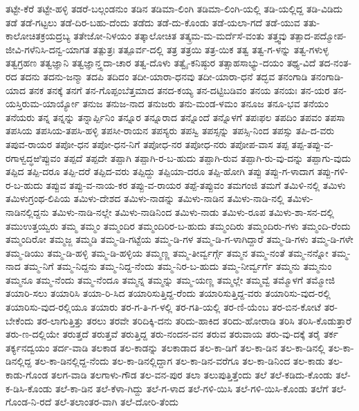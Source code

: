 ತಟ್ಟೇ-ಕೆರೆ
ತಟ್ಟೇ-ಹಳ್ಳಿ
ತಡರೆ-ಬಲ್ಗಂಡನುಂ
ತಡಿನ
ತಡಿಮಾ-ಲಿಂಗಿ
ತಡಿಮಾ-ಲಿಂಗಿ-ಯಲ್ಲಿ
ತಡಿ-ಯಲ್ಲಿದ್ದ
ತಡಿ-ವಿಡಿದು
ತಡೆ
ತಡೆ-ಗಟ್ಟಲು
ತಡೆ-ದಿರ-ಬಹು-ದೆಂದು
ತಡೆದು
ತಡೆ-ದು-ಕೊಂಡು
ತಡೆ-ಯಲಾ-ಗದೆ
ತಡೆ-ಯುವ
ತತು-ಕಾಲೋಚಿತಕ್ರಯದ್ರಬ್ಯ
ತತೇಜೋ-ನಿಳಯಂ
ತತ್ಕಾಲೋಚಿತ
ತತ್ಕ್ರಮ-ಮ-ಮರ್ದೆಸೆ-ವಂತು
ತತ್ತ್ವವು
ತತ್ಪಾದ-ಪದ್ಮೋಪ-ಜೀವಿ-ಗಳೆನಿಸಿ-ದನ್ವ-ಯಾಗತ
ತತ್ಪುತ್ರಃ
ತತ್ಪೂರ್ವ-ದಲ್ಲಿ
ತತ್ರ
ತತ್ರಯಿ
ತತ್ರ-ಯಿಕ
ತತ್ವ
ತತ್ವ-ಗ-ಳನ್ನು
ತತ್ವ-ಗಳುಳ್ಳ
ತತ್ವಗ್ರಹಣ
ತತ್ವಜ್ಞಾನಿ
ತತ್ವಜ್ಞಾನ್ತ್ಸದಾ-ಚಾರ
ತತ್ವ-ದೊಳು
ತತ್ವೈ-ಕನಿಷ್ಠುರ
ತತ್ಸಾಹಸಾಭ್ಯು-ದಯಂ
ತಥ್ಯ-ವಿದೆ
ತದ-ನಂತ-ರದ
ತದನು
ತದನು-ಜನ್ಮಾ
ತದಪಿ
ತದಿದಂ
ತದೀ-ಯಾರಾ-ಧನವು
ತದೀ-ಯಾರಾ-ಧನೆ
ತದ್ಭವ
ತನಂಗಾಡಿ
ತನಂಗಾಡಿ-ಯಾದ
ತನಕ
ತನಕ್ಕೆ
ತನಗೆ
ತನ-ಗೊಪ್ಪಂಬೆತ್ತಮಾದ
ತನದ-ಕಯ್ಯ
ತನ-ದಟ್ಟಿಬಡಿವಂ
ತನಯ
ತನಯಃ
ತನ-ಯರ
ತನ-ಯಸ್ತಿರುಮ-ಯಾರ್ಯ್ಯೋ
ತನುಜ
ತನುಜ-ನಾದ
ತನುಜರು
ತನು-ಮಂಡ-ಳಮಂ
ತನೂಜ
ತನೂ-ಭವ
ತನೆಯಂ
ತನೆಯರು
ತನ್ನ
ತನ್ನನ್ನು
ತನ್ನಾರ್ಪ್ಪಿನಿಂ
ತನ್ನೂರ
ತನ್ನೂರಾದ
ತನ್ನೊಂದೆ
ತನ್ನೊಳಗೆ
ತಪಃಫಲ
ತಪದಿಂ
ತಪವಂ
ತಪಸಾ
ತಪಸಿಯ
ತಪಸಿಯ-ತಪಸಿ-ಹಳ್ಳಿ
ತಪಸೀ-ರಾಯನ
ತಪಸ್ಯರು
ತಪಸ್ವಿ
ತಪಸ್ಸನ್ನು
ತಪಸ್ಸಿ-ನಿಂದ
ತಪಸ್ಸು
ತಪಿ-ದ-ವರು
ತಪುವ-ರಾಯರ
ತಪೋ-ಧನ
ತಪೋ-ಧನ-ನಿಗೆ
ತಪೋಧ-ನರ
ತಪೋಧ-ನರು
ತಪೋಪ-ವಾಸ
ತಪ್ಪ
ತಪ್ಪ-ತಪ್ಪು-ವ-ರಗಾಳ್ವದ್ಧಱಿಪ್ಪುವಂ
ತಪ್ಪದೆ
ತಪ್ಪದೇ
ತಪ್ಪಾಗಿ
ತಪ್ಪಾಗಿ-ರ-ಬ-ಹುದು
ತಪ್ಪಾಗಿ-ರುವ
ತಪ್ಪಾಗಿ-ರು-ವು-ದನ್ನು
ತಪ್ಪಾಗು-ವುದು
ತಪ್ಪಿದ
ತಪ್ಪಿ-ದರೂ
ತಪ್ಪಿ-ದರೆ
ತಪ್ಪಿದ-ವರು
ತಪ್ಪಿದ್ದು
ತಪ್ಪಿಯಾ-ದರೂ
ತಪ್ಪಿ-ಹೋಗಿ
ತಪ್ಪು
ತಪ್ಪು-ಗ-ಳಾದಾಗ
ತಪ್ಪು-ಗಳಿ-ರ-ಬ-ಹುದು
ತಪ್ಪುವ
ತಪ್ಪು-ವ-ನಾಯ-ಕರ
ತಪ್ಪು-ವ-ರಾಯರ
ತಪ್ಪೆ-ತಪ್ಪುವಂ
ತಮಗಂಜಿ
ತಮಗೆ
ತಮಿಳಿ-ನಲ್ಲಿ
ತಮಿಳು
ತಮಿಳುಗ್ರಂಥ-ಲಿಪಿಯ
ತಮಿಳು-ದೇಶದ
ತಮಿಳು-ನಾಡನ್ನು
ತಮಿಳು-ನಾಡಿನ
ತಮಿಳು-ನಾಡಿ-ನಲ್ಲಿ
ತಮಿಳು-ನಾಡಿನಲ್ಲಿದ್ದನು
ತಮಿಳು-ನಾಡಿ-ನಲ್ಲೇ
ತಮಿಳು-ನಾಡಿನಿಂದ
ತಮಿಳು-ನಾಡು
ತಮಿಳು-ರೂಪ
ತಮಿಳು-ಶಾ-ಸನ-ದಲ್ಲಿ
ತಮುಉತ್ತಯ್ವರು
ತಮ್ಮ
ತಮ್ಮಂ
ತಮ್ಮಂದಿರ
ತಮ್ಮಂದಿರಿರ-ಬ-ಹುದು
ತಮ್ಮಂದಿರು
ತಮ್ಮಂದಿರು-ಗಳು
ತಮ್ಮಂದಿ-ರೆಂದು
ತಮ್ಮಂದಿರೋ
ತಮ್ಮಜ್ಜ
ತಮ್ಮಡಿ
ತಮ್ಮ-ಡಿ-ಗಟ್ಟೆಯ
ತಮ್ಮ-ಡಿ-ಗಳ
ತಮ್ಮ-ಡಿ-ಗ-ಳಾಗಿದ್ದಾರೆ
ತಮ್ಮ-ಡಿ-ಗಳು
ತಮ್ಮ-ಡಿ-ಗಳೇ
ತಮ್ಮ-ಡಿಯು
ತಮ್ಮ-ಡಿ-ಹಳ್ಳಿ
ತಮ್ಮ-ಡಿ-ಹಳ್ಳಿಯ
ತಮ್ಮಣ್ಣ
ತಮ್ಮ-ತೀರ್ವ್ವರ್ಗ್ಗೆ
ತಮ್ಮನ
ತಮ್ಮ-ನಂತೆ
ತಮ್ಮ-ನನ್ನೋ
ತಮ್ಮ-ನಾದ
ತಮ್ಮ-ನಿಗೆ
ತಮ್ಮ-ನಿದ್ದನು
ತಮ್ಮ-ನಿದ್ದ-ನೆಂದು
ತಮ್ಮ-ನಿರ-ಬ-ಹುದು
ತಮ್ಮ-ನೀರ್ವ್ವರ್ಗೆ
ತಮ್ಮನು
ತಮ್ಮನುಂ
ತಮ್ಮನೂ
ತಮ್ಮ-ನೆಂದು
ತಮ್ಮ-ನೆಂದೂ
ತಮ್ಮನ್ನ
ತಮ್ಮನ್ನು
ತಮ್ಮ-ಯಣ್ಣ
ತಮ್ಮಲ್ಲೇ
ತಮ್ಮವ್ವೆ
ತಮ್ಮೊಳಗೆ
ತಮ್ಮೋಜಿ
ತಯಾರಿ-ಸಲು
ತಯಾರಿಸಿ
ತಯಾ-ರಿ-ಸಿದ
ತಯಾರಿಸುತ್ತಿದ್ದ-ರೆಂದು
ತಯಾರಿಸುತ್ತಿದ್ದ-ವರು
ತಯಾರಿಸು-ವುದ-ರಲ್ಲಿ
ತಯಾರಿಸು-ವುದ-ರಲ್ಲಿಯೂ
ತಯಾರು
ತರ-ಗ-ತಿ-ಗ-ಳಲ್ಲಿ
ತರ-ಗತಿ-ಯಲ್ಲಿ
ತರ-ಣಿ-ಯೆಂಬ
ತರ-ಬಿನ-ಕೋಟೆ
ತರ-ಬೇಕೆಂದು
ತರ-ಲಾಗುತ್ತಿತ್ತು
ತರಲು
ತರವೇ
ತರಿದಿಕ್ಕಿ-ದನು
ತರಿದು-ಹಾಕಿದ
ತರಿದು-ಹೋರಾಡಿ
ತರಿಸಿ
ತರಿಸಿ-ಕೊಡುತ್ತಾರೆ
ತರು-ಣ-ದಲ್ಲಿಯೇ
ತರುತ್ತದೆ
ತರುತ್ತವೆ
ತರುತ್ತಿದ್ದ
ತರು-ನಂದನ-ವನ
ತರುವ
ತರುವಾಯ
ತರು-ವು-ದಕ್ಕೆ
ತರೈ
ತರ್ಕ
ತರ್ಕ್ಯನದ್ವಯಂ
ತರ್ದ-ವಾಡಿ
ತಲಕಾಡ
ತಲ-ಕಾಡನ್ನು
ತಲಕಾಡಾದ
ತಲ-ಕಾ-ಡಿಗೆ
ತಲ-ಕಾ-ಡಿನ
ತಲ-ಕಾ-ಡಿನಲ್ಲಿ
ತಲ-ಕಾ-ಡಿನಲ್ಲಿದ್ದ
ತಲ-ಕಾ-ಡಿನಲ್ಲಿದ್ದ-ನೆಂದು
ತಲ-ಕಾ-ಡಿನಲ್ಲಿದ್ದಾಗ
ತಲ-ಕಾ-ಡಿನ-ವರೆಗೂ
ತಲ-ಕಾ-ಡಿನಿಂದ
ತಲ-ಕಾಡು
ತಲ-ಕಾಡು-ಗೊಂಡ
ತಲಗ-ವಾಡಿ
ತಲಗಾಳು-ಗೌಡ
ತಲ-ವನ-ಪುರ
ತಲಾ
ತಲುಪುತ್ತಿತ್ತೆಂದು
ತಲೆ
ತಲೆ-ಕಡಿದು-ಕೊಂಡು
ತಲೆ-ಕ-ಡಿಸಿ-ಕೊಂಡು
ತಲೆ-ಕಾ-ಡಿನ
ತಲೆ-ಕೆಳಾ-ಗಿದ್ದು
ತಲೆ-ಗ-ಳಾದ
ತಲೆ-ಗಳಿ-ಯಿಸಿ
ತಲೆ-ಗಳಿ-ಯಿಸಿ-ಕೊಂಡು
ತಲೆಗೆ
ತಲೆ-ಗೊಂಡ-ನಿ-ರದೆ
ತಲೆ-ತಲಾಂತರ-ವಾಗಿ
ತಲೆ-ದೋರಿ-ತೆಂದು
